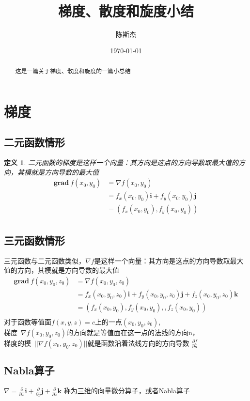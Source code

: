 \documentclass[UTF8]{ctexart}
\title{梯度、散度和旋度小结}
\author{陈斯杰}
\date{\today}
\newtheorem{deff}{定义}
\begin{document}
	\maketitle
	\begin{abstract}
	 \kaishu
	这是一篇关于梯度、散度和旋度的一篇小总结
	\end{abstract}
	
	
	\tableofcontents
	\section{梯度}
		\subsection{二元函数情形}
		\begin{deff}
			二元函数的梯度是这样一个向量：其方向是这点的方向导数取最大值的方向，其模就是方向导数的最大值
			\begin{align*}
			\textbf{grad}\ f(x_0,y_0)&=\nabla f(x_0,y_0)\\
									 &=f_x(x_0,y_0) \textbf{i} + f_y(x_0,y_0) \textbf{j}\\
									 &=(f_x(x_0,y_0), f_y(x_0,y_0))\\
			\end{align*}
		
		\end{deff}
	
		\subsection{三元函数情形}
			三元函数与二元函数类似，$\nabla f$是这样一个向量：其方向是这点的方向导数取最大值的方向，其模就是方向导数的最大值
			\begin{align*}
			\textbf{grad}\ f(x_0,y_0,z_0)&=\nabla f(x_0,y_0,z_0)\\
									 &=f_x(x_0,y_0,z_0) \textbf{i} + f_y(x_0,y_0,z_0) \textbf{j} + f_z(x_0,y_0,z_0) \textbf{k}\\
									 &=(f_x(x_0,y_0), f_y(x_0,y_0), , f_z(x_0,y_0))\\
			\end{align*}
			对于函数等值面$f(x,y,z)=c$上的一点$(x_0,y_0,z_0)$, \\
			梯度\ $\nabla f(x_0,y_0,z_0)$的方向就是等值面在这一点的法线的方向n，\\
			梯度的模\ $||\nabla f(x_0,y_0,z_0)||$就是函数沿着法线方向的方向导数
			$\frac{\partial f}{\partial n}$
		
		\subsection{Nabla算子}
			$\nabla= \frac{\partial }{\partial x} \textbf{i}
					+\frac{\partial }{\partial y} \textbf{j}			
					+\frac{\partial }{\partial z} \textbf{k}
			$
			称为三维的向量微分算子，或者Nabla算子\\			
 			 
\end{document}
